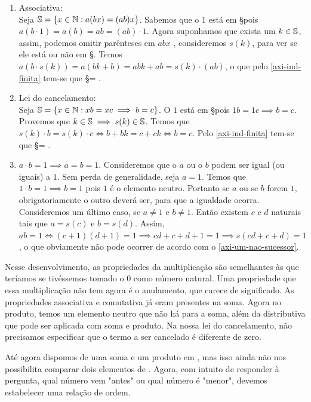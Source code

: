 \documentclass[../main.tex]{subfiles}
\begin{document}
\begin{dem}
\begin{enumerate}[label=(\roman*)]
        \item Associativa:  \\
            Seja $\S = \{ x \in \N : a(bx) = (ab)x \}$. Sabemos que o $1$ está em \S pois $a (b \cdot 1) = a(b) = ab = (ab)\cdot 1$.
            Agora suponhamos que exista um $k \in \S$, assim, podemos omitir parênteses em $abx$ , consideremos $s(k)$, para ver se ele está ou não em \S. Temos
            $a(b \cdot s(k)) = a(bk + b) = abk + ab = s(k) \cdot  (ab)$, o que pelo \cref{axi-ind-finita} tem-se que \S = \N. 
            
            
            
        \item Lei do cancelamento: \\
            Seja $\S = \{ x \in \N : xb = xc \implies b = c\}$. O $1$ está em \S pois $1b = 1c \implies b = c$. Provemos que $k\in \S \implies s(k) \in \S$. Temos que $s(k) \cdot b = s(k) \cdot c \iff b + bk = c + ck \iff b = c$. Pelo \cref{axi-ind-finita} tem-se que \S = \N.
        \item $a \cdot b = 1 \implies a = b = 1$.
            Consideremos que o $a$ ou o $b$ podem ser igual (ou iguais) a $1$.
            Sem perda de generalidade, seja $a = 1$. Temos que $1 \cdot b = 1 \implies b = 1$ pois $1$ é o elemento neutro. Portanto se $a$ ou se $b$ forem $1$, obrigatoriamente o outro deverá ser, para que a igualdade ocorra.
            Consideremos um último caso, se $a \neq 1$ e $ b \neq 1$. Então existem $c$ e $d$ naturais tais que $a = s(c)$ e $b = s(d)$.
            Assim, $ab=1 \iff (c+1) (d+1) = 1 \implies cd + c + d + 1 = 1 \implies s(cd + c + d) = 1$, o que obviamente não pode ocorrer de acordo com o  \cref{axi-um-nao-sucessor}.
    \end{enumerate}
\end{dem}

Nesse desenvolvimento, as propriedades da multiplicação são semelhantes às que teríamos se tivéssemos tomado o $0$ como número natural. Uma propriedade que essa multiplicação não tem agora é o anulamento, que carece de significado. As propriedades associativa e comutativa já eram presentes na soma. Agora no produto, temos um elemento neutro que não há para a soma, além da distributiva que pode ser aplicada com soma e produto.
Na nossa lei do cancelamento, não precisamos especificar que o termo a ser cancelado é diferente de zero.


Até agora dispomos de uma soma e um produto em \N, mas isso ainda não nos possibilita comparar dois elementos de \N. Agora, com intuito de responder à pergunta, qual número vem "antes" ou qual número é "menor", devemos estabelecer uma relação de ordem. 
\end{document}
